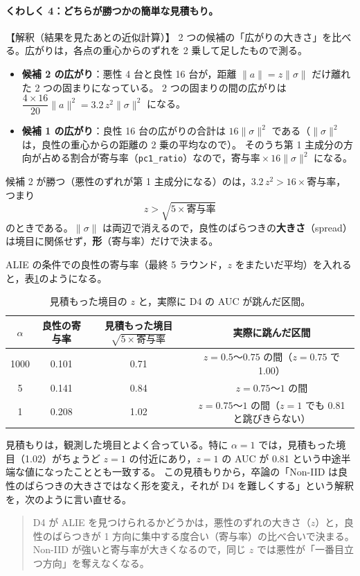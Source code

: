 \documentclass[a4j, dvipdfmx]{jsarticle}  %
\begin{document}
\paragraph{くわしく 4：どちらが勝つかの簡単な見積もり。}【解釈（結果を見たあとの近似計算）】
2 つの候補の「広がりの大きさ」を比べる。広がりは，各点の重心からのずれを 2 乗して足したもので測る。
\begin{itemize}
  \item \textbf{候補 2 の広がり}：悪性 4 台と良性 16 台が，距離 $\|a\| = z\|\sigma\|$ だけ離れた 2 つの固まりになっている。
        2 つの固まりの間の広がりは $\dfrac{4 \times 16}{20} \|a\|^2 = 3.2\, z^2 \|\sigma\|^2$ になる。
  \item \textbf{候補 1 の広がり}：良性 16 台の広がりの合計は $16 \|\sigma\|^2$ である（$\|\sigma\|^2$ は，良性の重心からの距離の 2 乗の平均なので）。
        そのうち第 1 主成分の方向が占める割合が寄与率（\texttt{pc1\_ratio}）なので，$\text{寄与率} \times 16 \|\sigma\|^2$ になる。
\end{itemize}
候補 2 が勝つ（悪性のずれが第 1 主成分になる）のは，$3.2\, z^2 > 16 \times \text{寄与率}$，つまり
\begin{equation*}
  z > \sqrt{5 \times \text{寄与率}}
\end{equation*}
のときである。$\|\sigma\|$ は両辺で消えるので，良性のばらつきの\textbf{大きさ}（spread）は境目に関係せず，\textbf{形}（寄与率）だけで決まる。

ALIE の条件での良性の寄与率（最終 5 ラウンド，$z$ をまたいだ平均）を入れると，表\ref{tab:d4-threshold}のようになる。

\begin{table}[H]
\centering
\caption{見積もった境目の $z$ と，実際に D4 の AUC が跳んだ区間。}
\label{tab:d4-threshold}
\begin{tabular}{@{}cccc@{}}
\toprule
$\alpha$ & 良性の寄与率 & 見積もった境目 $\sqrt{5 \times \text{寄与率}}$ & 実際に跳んだ区間 \\
\midrule
1000 & 0.101 & 0.71 & $z = 0.5$〜$0.75$ の間（$z = 0.75$ で 1.00） \\
5 & 0.141 & 0.84 & $z = 0.75$〜$1$ の間 \\
1 & 0.208 & 1.02 & $z = 0.75$〜$1$ の間（$z = 1$ でも 0.81 と跳びきらない） \\
\bottomrule
\end{tabular}
\end{table}

見積もりは，観測した境目とよく合っている。特に $\alpha = 1$ では，見積もった境目（1.02）がちょうど $z = 1$ の付近にあり，$z = 1$ の AUC が 0.81 という中途半端な値になったこととも一致する。
この見積もりから，卒論の「Non-IID は良性のばらつきの大きさではなく形を変え，それが D4 を難しくする」という解釈を，次のように言い直せる。
\begin{quote}
D4 が ALIE を見つけられるかどうかは，悪性のずれの大きさ（$z$）と，良性のばらつきが 1 方向に集中する度合い（寄与率）の比べ合いで決まる。
Non-IID が強いと寄与率が大きくなるので，同じ $z$ では悪性が「一番目立つ方向」を奪えなくなる。
\end{quote}
\end{document}

